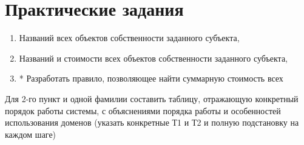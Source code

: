 
\chapter{Практические задания}

\begin{enumerate}
	\item Названий всех объектов собственности заданного субъекта,
	\item Названий и стоимости всех объектов собственности заданного субъекта,
	\item * Разработать правило, позволяющее найти суммарную стоимость всех
\end{enumerate}

Для 2-го пункт и одной фамилии составить таблицу, отражающую конкретный
порядок работы системы, с объяснениями порядка работы и особенностей использования
доменов (указать конкретные Т1 и Т2 и полную подстановку на каждом шаге)


